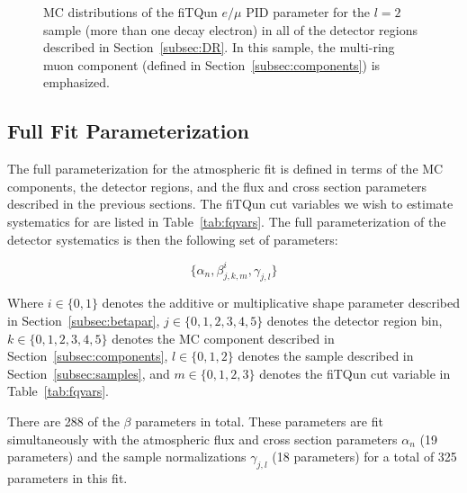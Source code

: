 {\begin{figure}[h!]
\begin{tabular}{l  l  l}
\end{tabular} 
\caption{MC distributions of the fiTQun $e/\mu$ PID parameter for the $l=2$ 
sample (more than one decay electron) in all of the detector regions described in
Section~\ref{subsec:DR}.  In this sample, the multi-ring muon component
(defined in Section~\ref{subsec:components}) is emphasized.}
\label{fig:samplot2}
\end{figure}
\FloatBarrier




\subsection{Full Fit Parameterization}
\label{subsec:fullpars}

The full parameterization for the atmospheric fit is defined in terms of the MC
components, the detector regions, and the flux and cross section parameters
described in the previous sections.  The fiTQun cut variables we wish to
estimate systematics for are listed in Table~\ref{tab:fqvars}. The full
parameterization of the detector systematics is then the following set of
parameters:

\begin{equation}
  \label{eq:fullpars}
  \{\alpha_{n}, \beta_{j,k,m}^{i}, \gamma_{j,l} \}
\end{equation}

Where $i \in \{0,1\}$ denotes the additive or multiplicative shape parameter
described in Section~\ref{subsec:betapar}, $j \in \{0,1,2,3,4,5\}$ denotes the
detector region bin, $k \in \{0,1,2,3,4,5\}$ denotes the MC component described
in Section~\ref{subsec:components},  $l \in \{0,1,2\}$ denotes the sample
described in Section~\ref{subsec:samples}, and $m \in \{0,1,2,3\}$ denotes the
fiTQun cut variable in Table~\ref{tab:fqvars}. 

There are 288 of the $\beta$ parameters in total.  These parameters are fit
simultaneously with the atmospheric flux and cross section parameters
$\alpha_{n}$ (19 parameters) and the sample normalizations $\gamma_{j,l}$ (18
parameters) for a total of 325 parameters in this fit.



}
